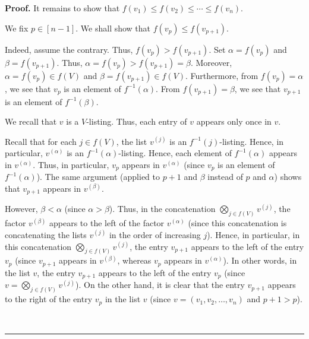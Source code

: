 \documentclass[numbers=enddot,12pt,final,onecolumn,notitlepage]{scrartcl}%
\numberwithin{exer}{section}
\theoremstyle{definition}
\newenvironment{proof}[1][Proof]{\noindent\textbf{#1.} }{\ \rule{0.5em}{0.5em}}
\newenvironment{verlong}{}{}
\begin{document}
\begin{verlong}
\begin{proof}
It remains to show that $f\left(  v_{1}\right)  \leq f\left(  v_{2}\right)
\leq\cdots\leq f\left(  v_{n}\right)  $.

We fix $p\in\left[  n-1\right]  $. We shall show that $f\left(  v_{p}\right)
\leq f\left(  v_{p+1}\right)  $.

Indeed, assume the contrary. Thus, $f\left(  v_{p}\right)  >f\left(
v_{p+1}\right)  $. Set $\alpha=f\left(  v_{p}\right)  $ and $\beta=f\left(
v_{p+1}\right)  $. Thus, $\alpha=f\left(  v_{p}\right)  >f\left(
v_{p+1}\right)  =\beta$. Moreover, $\alpha=f\left(  v_{p}\right)  \in f\left(
V\right)  $ and $\beta=f\left(  v_{p+1}\right)  \in f\left(  V\right)  $.
Furthermore, from $f\left(  v_{p}\right)  =\alpha$, we see that $v_{p}$ is an
element of $f^{-1}\left(  \alpha\right)  $. From $f\left(  v_{p+1}\right)
=\beta$, we see that $v_{p+1}$ is an element of $f^{-1}\left(  \beta\right)  $.

We recall that $v$ is a $V$-listing. Thus, each entry of $v$ appears only once
in $v$.

Recall that for each $j\in f\left(  V\right)  $, the list $v^{\left(
j\right)  }$ is an $f^{-1}\left(  j\right)  $-listing. Hence, in particular,
$v^{\left(  \alpha\right)  }$ is an $f^{-1}\left(  \alpha\right)  $-listing.
Hence, each element of $f^{-1}\left(  \alpha\right)  $ appears in $v^{\left(
\alpha\right)  }$. Thus, in particular, $v_{p}$ appears in $v^{\left(
\alpha\right)  }$ (since $v_{p}$ is an element of $f^{-1}\left(
\alpha\right)  $). The same argument (applied to $p+1$ and $\beta$ instead of
$p$ and $\alpha$) shows that $v_{p+1}$ appears in $v^{\left(  \beta\right)  }$.

However, $\beta<\alpha$ (since $\alpha>\beta$). Thus, in the concatenation
$\bigotimes\limits_{j\in f\left(  V\right)  }v^{\left(  j\right)  }$, the
factor $v^{\left(  \beta\right)  }$ appears to the left of the factor
$v^{\left(  \alpha\right)  }$ (since this concatenation is concatenating the
lists $v^{\left(  j\right)  }$ in the order of increasing $j$). Hence, in
particular, in this concatenation $\bigotimes\limits_{j\in f\left(  V\right)
}v^{\left(  j\right)  }$, the entry $v_{p+1}$ appears to the left of the entry
$v_{p}$ (since $v_{p+1}$ appears in $v^{\left(  \beta\right)  }$, whereas
$v_{p}$ appears in $v^{\left(  \alpha\right)  }$). In other words, in the list
$v$, the entry $v_{p+1}$ appears to the left of the entry $v_{p}$ (since
$v=\bigotimes\limits_{j\in f\left(  V\right)  }v^{\left(  j\right)  }$). On
the other hand, it is clear that the entry $v_{p+1}$ appears to the right of
the entry $v_{p}$ in the list $v$ (since $v=\left(  v_{1},v_{2},\ldots
,v_{n}\right)  $ and $p+1>p$).


\end{proof}
\end{verlong}
\end{document}
